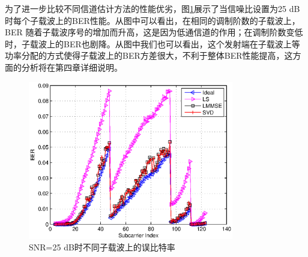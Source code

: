 为了进一步比较不同信道估计方法的性能优劣，图\ref{fig:BER_sc}展示了当信噪比设置为25 dB时每个子载波上的BER性能。从图中可以看出，在相同的调制阶数的子载波上，BER 随着子载波序号的增加而升高，这是因为低通信道的作用；在调制阶数变低时，子载波上的BER也剧降。从图中我们也可以看出，这个发射端在子载波上等功率分配的方式使得子载波上的BER方差很大，不利于整体BER性能提高，这方面的分析将在第四章详细说明。
\begin{figure}[htbp]
\centering
\includegraphics[width=0.8\textwidth]{figures/chapter-3/BER_sc.eps}
\caption{SNR=25 dB时不同子载波上的误比特率}
\label{fig:BER_sc}
\end{figure}


